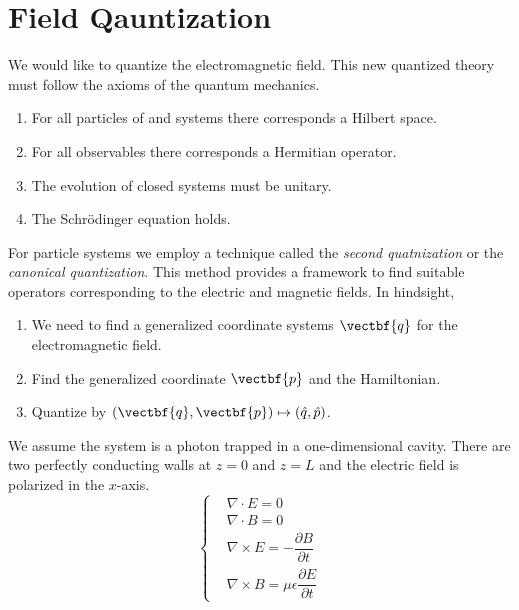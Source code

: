 \chapter{Field Qauntization}
We would like to quantize the electromagnetic field. This new quantized theory must follow the axioms of the quantum mechanics.

\begin{enumerate}
    \item For all particles of and systems there corresponds a Hilbert space.
    \item For all observables there corresponds a Hermitian operator.
    \item The evolution of closed systems must be unitary.
    \item The Schr\"{o}dinger equation holds.
\end{enumerate}

For particle systems we employ a technique called the \emph{second quatnization} or the \emph{canonical quantization}. This method provides a framework to find suitable operators corresponding to the electric and magnetic fields. In hindsight,

\begin{enumerate}
    \item We need to find a generalized coordinate systems \(\vectbf{q}\) for the electromagnetic field.
    \item Find the generalized coordinate \(\vectbf{p}\) and the Hamiltonian.
    \item Quantize by \((\vectbf{q},\vectbf{p}) \mapsto (\hat{q}, \hat{p})\).
\end{enumerate}

We assume the system is a photon trapped in a one-dimensional cavity. There are two perfectly conducting walls at \(z = 0\) and \(z = L\) and the electric field is polarized in the \(x\)-axis. 
\begin{equation*}
    \begin{cases}
        &\nabla \cdot E = 0\\
        &\nabla \cdot B = 0\\
        &\nabla \times E =  -\dfrac{\partial B}{\partial t}\\
        &\nabla \times B = \mu \epsilon \dfrac{\partial E}{\partial t}
    \end{cases}
\end{equation*}

